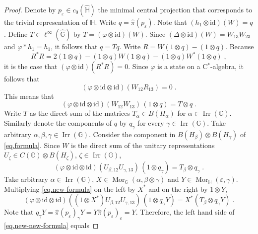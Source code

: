 \documentclass[10pt,a4paper]{amsart}
\begin{document}
\begin{proof}
Denote by $p_\varepsilon \in c_0(\widehat{\mathbb{H}})$ the minimal central projection that corresponds to the trivial representation of $\mathbb{H}$. Write $q = \widehat{\pi}(p_\varepsilon)$. Note that $(h_1 \otimes \mathrm{id})(W) = q$. Define $T \in \ell^\infty(\widehat{\mathbb{G}})$ by $T = (\varphi \otimes \mathrm{id})(W)$. Since $(\Delta \otimes \mathrm{id})(W) = W_{13} W_{23}$ and $\varphi \ast h_1 = h_1$, it follows that $q = T q$. Write $R = W(1 \otimes q) - (1 \otimes q)$. Because
$$R^* R = 2 (1 \otimes q) - (1 \otimes q) W (1 \otimes q) - (1 \otimes q) W^* (1 \otimes q) \; ,$$
it is the case that $(\varphi \otimes \mathrm{id})(R^* R) = 0$. Since $\varphi$ is a state on a C$^*$-algebra, it follows that
$$(\varphi \otimes \mathrm{id} \otimes \mathrm{id})(W_{12} R_{13}) = 0 \; .$$
This means that
\begin{equation}\label{eq.formula}
(\varphi \otimes \mathrm{id} \otimes \mathrm{id})(W_{12} W_{13}) \, (1 \otimes q) = T \otimes q \; .
\end{equation}
Write $T$ as the direct sum of the matrices $T_\alpha \in B(H_\alpha)$ for $\alpha \in \operatorname{Irr}(\mathbb{G})$. Similarly denote the components of $q$ by $q_\gamma$ for every $\gamma \in \operatorname{Irr}(\mathbb{G})$. Take arbitrary $\alpha,\beta,\gamma \in \operatorname{Irr}(\mathbb{G})$. Consider the component in $B(H_\beta) \otimes B(H_\gamma)$ of \eqref{eq.formula}. Since $W$ is the direct sum of the unitary representations $U_\zeta \in C(\mathbb{G}) \otimes B(H_\zeta)$, $\zeta \in \operatorname{Irr}(\mathbb{G})$,
\begin{equation}\label{eq.new-formula}
(\varphi \otimes \mathrm{id} \otimes \mathrm{id})(U_{\beta,12} U_{\gamma,13}) \, (1 \otimes q_\gamma) = T_\beta \otimes q_\gamma \; .
\end{equation}
Take arbitrary $\alpha \in \operatorname{Irr}(\mathbb{G})$, $X \in \operatorname{Mor}_\mathbb{G}(\alpha,\beta \otimes \gamma)$ and $Y \in \operatorname{Mor}_\mathbb{H}(\varepsilon,\gamma)$. Multiplying \eqref{eq.new-formula} on the left by $X^*$ and on the right by $1 \otimes Y$,
\begin{equation}\label{eq.new-new-formula}
(\varphi \otimes \mathrm{id} \otimes \mathrm{id})((1 \otimes X^*) U_{\beta,12} U_{\gamma,13}) \, (1 \otimes q_\gamma Y) = X^*(T_\beta \otimes q_\gamma Y) \; .
\end{equation}
Note that $q_\gamma Y = \widehat{\pi}(p_\varepsilon)_\gamma Y = Y \widehat{\pi}(p_\varepsilon)_\varepsilon = Y$. Therefore, the left hand side of \eqref{eq.new-new-formula} equals

\end{proof}
\end{document}
